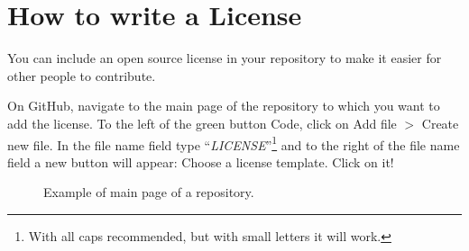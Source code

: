 \section{How to write a License}

You can include an open source license in your repository to make it easier for other people to contribute.

On \textsf{GitHub}, navigate to the main page of the repository to which you want to add the license. To the left of the green button \textsf{Code}, click on \textsf{Add file} $>$ \textsf{Create new file}. In the file name field type ``\textit{LICENSE}''\footnote{With all caps recommended, but with small letters it will work.} and to the right of the file name field a new button will appear: \textsf{Choose a license template}. Click on it!

\begin{figure} %
    \centering
    \caption{Example of main page of a repository.}
    \label{fig:Fork}
\end{figure}

